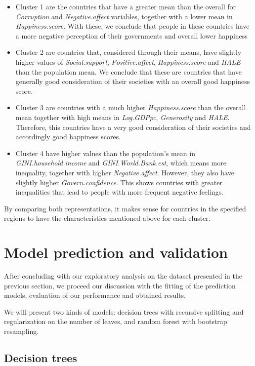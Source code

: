 \documentclass[12pt]{extarticle}
\begin{document}
\begin{itemize}
    \item Cluster 1 are the countries that have a greater mean than the overall for \textit{Corruption} and \textit{Negative.affect} variables, together with a lower mean in \textit{Happiness.score}. With these, we conclude that people in these countries have a more negative perception of their governments and overall lower happiness
    \item Cluster 2 are countries that, considered through their means,  have slightly higher values of \textit{Social.support}, \textit{Positive.affect}, \textit{Happiness.score} and \textit{HALE} than the population mean. We conclude that these are countries that have generally good consideration of their societies with an overall good happiness score.
    \item Cluster 3 are countries with a much higher \textit{Happiness.score} than the overall mean together with high means in \textit{Log.GDPpc}, \textit{Generosity} and \textit{HALE}. Therefore, this countries have a very good consideration of their societies and accordingly good happiness scores.
    \item Cluster 4 have higher values than the population’s mean in \textit{GINI.household.income} and \textit{GINI.World.Bank.est}, which means more inequality, together with higher \textit{Negative.affect}. However, they also have slightly higher \textit{Govern.confidence}. This shows countries with greater inequalities that lead to people with more frequent negative feelings.
\end{itemize}

By comparing both representations, it makes sense for countries in the specified regions to have the characteristics mentioned above for each cluster.

\section{Model prediction and validation}

After concluding with our exploratory analysis on the dataset presented in the previous section, we proceed our discussion with the fitting of the prediction models, evaluation of our performance and obtained results.

We will present two kinds of models: decision trees with recursive splitting and regularization on the number of leaves, and random forest with bootstrap resampling.


\subsection{Decision trees}
\end{document}
